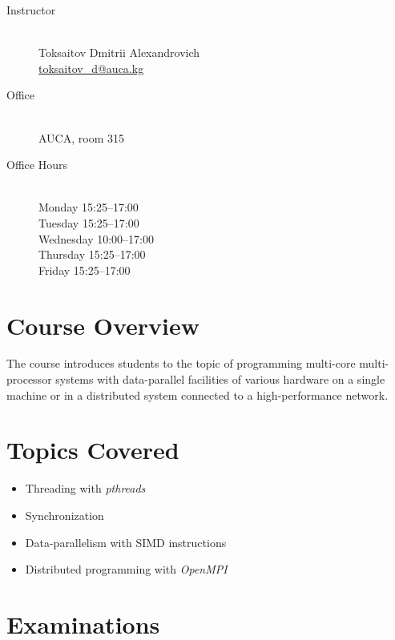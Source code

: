 \documentclass[12pt,a4paper,oneside]{article}
\begin{document}
        \begin{description}
            \item[Instructor]\hfill\\
                Toksaitov Dmitrii Alexandrovich\\
                \href{mailto:toksaitov_d@auca.kg}{toksaitov\_d@auca.kg}
            \item[Office]\hfill\\
                AUCA, room 315
            \item[Office Hours]\hfill\\
                Monday 15:25--17:00\\
                Tuesday 15:25--17:00\\
                Wednesday 10:00--17:00\\
                Thursday 15:25--17:00\\
                Friday 15:25--17:00
        \end{description}

    \section{Course Overview}

        The course introduces students to the topic of programming multi-core
        multi-processor systems with data-parallel facilities of various
        hardware on a single machine or in a distributed system connected to a
        high-performance network.

    \section{Topics Covered}

        \begin{itemize}
            \item Threading with \textit{pthreads}
            \item Synchronization
            \item Data-parallelism with SIMD instructions
            \item Distributed programming with \textit{OpenMPI}
        \end{itemize}

    \section{Examinations}
\end{document}
